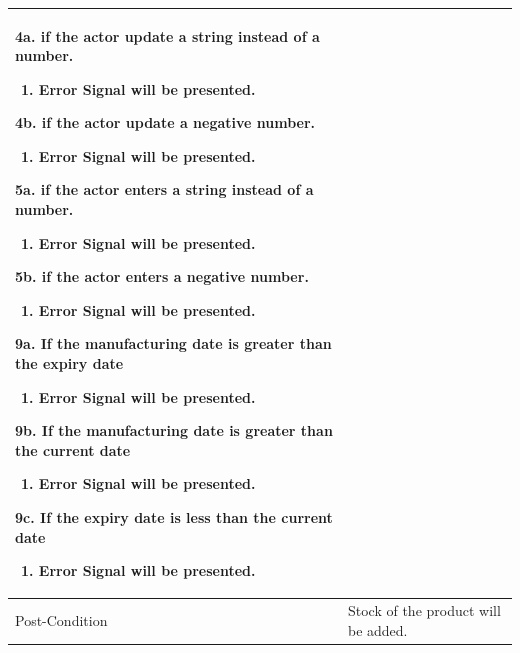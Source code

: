 \documentclass[12pt,a4paper]{article}
\begin{document}
\begin{longtable}{| p{3cm}|p{12cm}|}
4a. if the actor update a string instead of a number.
 	\begin{enumerate}
		\item Error Signal will be presented.
	\end{enumerate}
4b. if the actor update a negative number.
 	\begin{enumerate}
		\item Error Signal will be presented.
	\end{enumerate}
5a. if the actor enters a string instead of a number.
 	\begin{enumerate}
		\item Error Signal will be presented.
	\end{enumerate}
5b. if the actor enters a negative number.
 	\begin{enumerate}
		\item Error Signal will be presented.
	\end{enumerate}
9a. If the manufacturing date is greater than the expiry date
	\begin{enumerate}
		\item Error Signal will be presented.
	\end{enumerate}
9b. If the manufacturing date is greater than the current date
	\begin{enumerate}
		\item Error Signal will be presented.
	\end{enumerate}
9c. If the expiry date is less than the current date
	\begin{enumerate}
		\item Error Signal will be presented.
	\end{enumerate}
\\ \hline
Post-Condition &  Stock of the product will be added. \\ \hline
\end{longtable}
\end{document}
